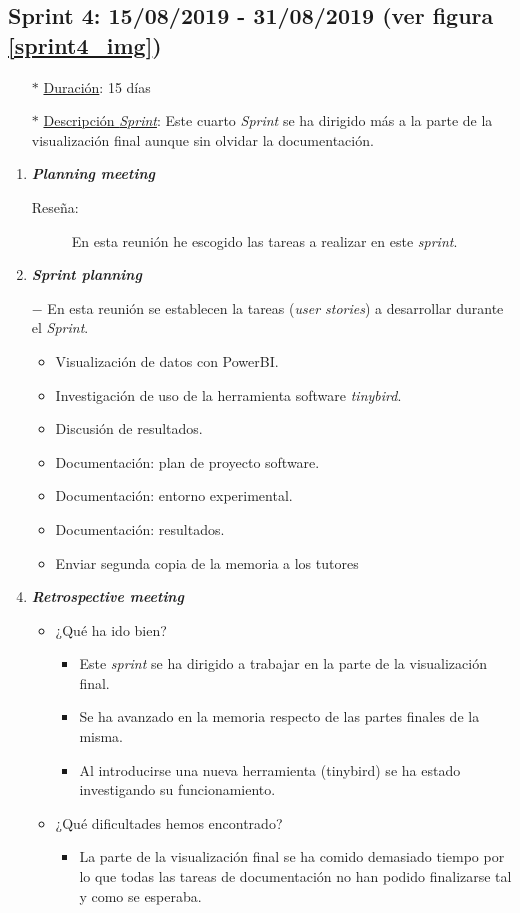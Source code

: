 \subsection{Sprint 4: 15/08/2019 - 31/08/2019 (ver figura \ref{sprint4_img})}\label{sprint4}
\begin{itemize}
	\item[$\ast$] \underline{Duración}:  15 días
	\item[$\ast$] \underline{Descripción \textit{Sprint}}: Este cuarto \textit{Sprint} se ha dirigido más a la parte de la visualización final aunque sin olvidar la documentación.
\end{itemize}
\begin{enumerate}
	\item \textbf{\textit{Planning meeting}}
	\begin{description}
		\item[Reseña:] En esta reunión he escogido las tareas a realizar en este \textit{sprint}.
	\end{description}
	\item \textbf{\textit{Sprint planning}}
	\item[$-$] En esta reunión se establecen la tareas (\textit{user stories}) a desarrollar durante el \textit{Sprint}. 
	\begin{itemize}
		\item Visualización de datos con PowerBI.
		\item Investigación de uso de la herramienta software \textit{tinybird}.
		\item Discusión de resultados.
		\item Documentación: plan de proyecto software.
		\item Documentación: entorno experimental.
		\item Documentación: resultados.
		\item Enviar segunda copia de la memoria a los tutores
	\end{itemize}
	\item \textbf{\textit{Retrospective meeting}}
	\begin{itemize}
		\item ¿Qué ha ido bien?
		\begin{itemize}
			\item Este \textit{sprint} se ha dirigido a trabajar en la parte de la visualización final.
			\item Se ha avanzado en la memoria respecto de las partes finales de la misma. 
			\item Al introducirse una nueva herramienta (tinybird) se ha estado investigando su funcionamiento.
		\end{itemize}
		\item ¿Qué dificultades hemos encontrado?
		\begin{itemize}
			\item La parte de la visualización final se ha comido demasiado tiempo por lo que todas las tareas de documentación no han podido finalizarse tal y como se esperaba.
		\end{itemize}
	\end{itemize}	
\end{enumerate}

